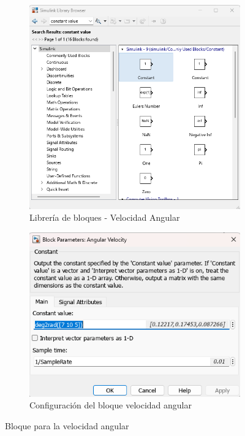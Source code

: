 \begin{figure}[htbp]
    \centering
    \begin{subfigure}[b]{0.45\textwidth}
        \centering
        \includegraphics[width=\textwidth]{fig/Capitulo5/Caso_de_estudio_IMU/Generador_de_archivos/libreria_de_bloques_constante_velocidad_angular.png}
        \caption{Librería de bloques - Velocidad Angular}
        \label{fig:lib_bloques_angular_velocity}
    \end{subfigure}
    \hfill
    \begin{subfigure}[b]{0.45\textwidth}
        \centering
        \includegraphics[width=\textwidth]{fig/Capitulo5/Caso_de_estudio_IMU/Generador_de_archivos/configuracion_bloque_velocidad_angular.png}
        \caption{Configuración del bloque velocidad angular}
        \label{fig:lib_bloques_config_angular_velocity}
    \end{subfigure}
    \caption{Bloque para la velocidad angular}
    \label{fig:angular_velocity_block_simulink}
\end{figure}



